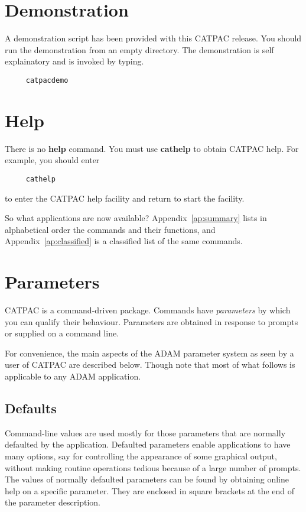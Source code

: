 \section{Demonstration}
A demonstration script has been provided with this CATPAC release. You should
run the demonstration from an empty directory. The demonstration is self 
explainatory and is invoked by typing.

\begin{verbatim}
     catpacdemo
\end{verbatim}

\section{Help}

There is no {\bf help} command.  You must use {\bf cathelp} to
obtain {\sc CATPAC} help.  For example, you should enter 

\begin{verbatim}
     cathelp 
\end{verbatim}

to enter the CATPAC help facility and return to start the facility.


So what applications are now available?  Appendix~\ref{ap:summary} lists
in alphabetical order the commands and their functions, and
Appendix~\ref{ap:classified} is a classified list of the same commands. 


\section{Parameters}
\label{se:param}

{\small CATPAC} is a command-driven package.  Commands have {\em parameters\/}
by which you can qualify their behaviour. Parameters are obtained in response
to prompts or supplied on a command line.

For convenience, the main aspects of the {\small ADAM} parameter system
as seen by a user of {\small CATPAC} are described below.  Though note
that most of what follows is applicable to any {\small ADAM}
application.

\subsection{Defaults}
\label{se:defaults}

Command-line values are used mostly for those parameters that are normally
defaulted by the application.   Defaulted parameters enable applications to
have many options, say for controlling the appearance of some graphical output,
without making routine operations tedious because of a large number of prompts.
The values of normally defaulted parameters can be found by obtaining online
help on a specific parameter.  They are enclosed in square brackets at the end
of the parameter description.

